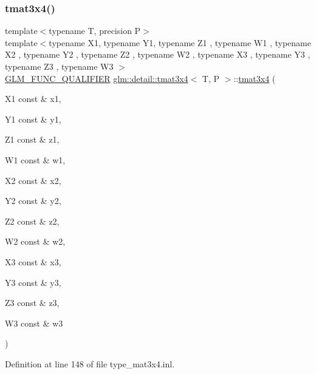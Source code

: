 \subsubsection{\texorpdfstring{tmat3x4()}{tmat3x4()}\hspace{0.1cm}{\footnotesize\ttfamily [20/22]}}
{\footnotesize\ttfamily template$<$typename T, precision P$>$ \\
template$<$typename X1, typename Y1, typename Z1 , typename W1 , typename X2 , typename Y2 , typename Z2 , typename W2 , typename X3 , typename Y3 , typename Z3 , typename W3 $>$ \\
\hyperlink{setup_8hpp_a33fdea6f91c5f834105f7415e2a64407}{G\+L\+M\+\_\+\+F\+U\+N\+C\+\_\+\+Q\+U\+A\+L\+I\+F\+I\+ER} \hyperlink{structglm_1_1detail_1_1tmat3x4}{glm\+::detail\+::tmat3x4}$<$ T, P $>$\+::\hyperlink{structglm_1_1detail_1_1tmat3x4}{tmat3x4} (\begin{DoxyParamCaption}\item[{X1 const \&}]{x1,  }\item[{Y1 const \&}]{y1,  }\item[{Z1 const \&}]{z1,  }\item[{W1 const \&}]{w1,  }\item[{X2 const \&}]{x2,  }\item[{Y2 const \&}]{y2,  }\item[{Z2 const \&}]{z2,  }\item[{W2 const \&}]{w2,  }\item[{X3 const \&}]{x3,  }\item[{Y3 const \&}]{y3,  }\item[{Z3 const \&}]{z3,  }\item[{W3 const \&}]{w3 }\end{DoxyParamCaption})}



Definition at line 148 of file type\+\_\+mat3x4.\+inl.

\mbox{\label{structglm_1_1detail_1_1tmat3x4_acace185cb00ee79dd090605deefb3dfa}} 
